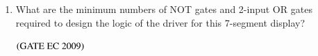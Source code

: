 \documentclass[journal,12pt,onecolumn]{IEEEtran}
\theoremstyle{remark}
\begin{document}
\begin{enumerate}[start=1, label={Q\arabic*.}]
\item What are the minimum numbers of NOT gates and 2-input OR gates required to design the logic of the driver for this 7-segment display?

\begin{enumerate}
\end{enumerate}
\hfill $\left(\text{GATE EC 2009}\right)$
\end{enumerate}
\end{document}
